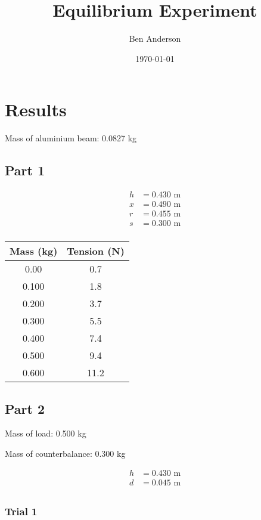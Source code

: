 \documentclass[a4paper,11pt]{article}
\begin{document}
\title{Equilibrium Experiment}
\author{Ben Anderson}
\date{\today}
\maketitle


\section{Results}

Mass of aluminium beam: 0.0827 kg

\subsection{Part 1}

$$
\begin{aligned}
h & = 0.430\mbox{ m} \\
x & = 0.490\mbox{ m} \\
r & = 0.455\mbox{ m} \\
s & = 0.300\mbox{ m} \\
\end{aligned}
$$

\begin{center}
\begin{tabular}{c|c}
Mass (kg) & Tension (N) \\
\hline
0.00  & 0.7 \\
0.100 & 1.8 \\
0.200 & 3.7 \\
0.300 & 5.5 \\
0.400 & 7.4 \\
0.500 & 9.4 \\
0.600 & 11.2 \\
\end{tabular}
\end{center}


\subsection{Part 2}

Mass of load: 0.500 kg

Mass of counterbalance: 0.300 kg

$$
\begin{aligned}
h & = 0.430\mbox{ m} \\
d & = 0.045\mbox{ m} \\
\end{aligned}
$$


\subsubsection{Trial 1}
\end{document}
